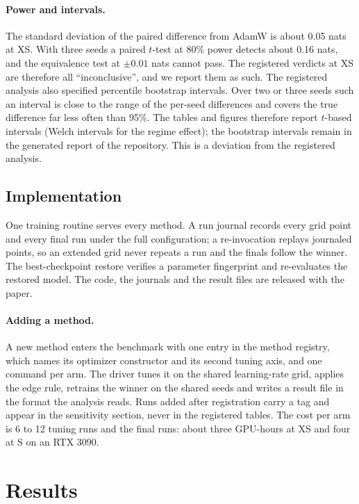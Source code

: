 \documentclass[twoside,11pt]{article}
\begin{document}
\paragraph{Power and intervals.} The standard deviation of the paired difference from AdamW is about 0.05 nats at XS. With three seeds a paired $t$-test at 80\% power detects about 0.16 nats, and the equivalence test at $\pm 0.01$ nats cannot pass. The registered verdicts at XS are therefore all ``inconclusive'', and we report them as such. The registered analysis also specified percentile bootstrap intervals. Over two or three seeds such an interval is close to the range of the per-seed differences and covers the true difference far less often than 95\%. The tables and figures therefore report $t$-based intervals (Welch intervals for the regime effect); the bootstrap intervals remain in the generated report of the repository. This is a deviation from the registered analysis.

\subsection{Implementation}
\label{sec:impl}

One training routine serves every method. A run journal records every grid point and every final run under the full configuration; a re-invocation replays journaled points, so an extended grid never repeats a run and the finals follow the winner. The best-checkpoint restore verifies a parameter fingerprint and re-evaluates the restored model. The code, the journals and the result files are released with the paper.

\paragraph{Adding a method.}
A new method enters the benchmark with one entry in the method registry, which names its optimizer constructor and its second tuning axis, and one command per arm. The driver tunes it on the shared learning-rate grid, applies the edge rule, retrains the winner on the shared seeds and writes a result file in the format the analysis reads. Runs added after registration carry a tag and appear in the sensitivity section, never in the registered tables. The cost per arm is 6 to 12 tuning runs and the final runs: about three GPU-hours at XS and four at S on an RTX 3090.

\section{Results}
\label{sec:results}
\end{document}
